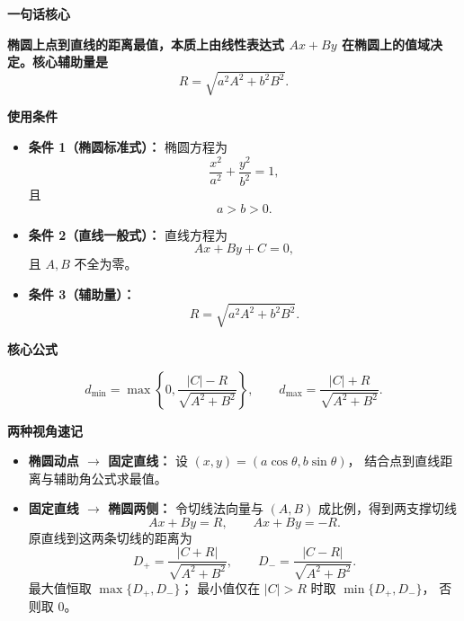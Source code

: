 \begin{summarybox}
	\textbf{\textcolor{CSummary}{一句话核心}}

	\textbf{椭圆上点到直线的距离最值，本质上由线性表达式 \(Ax+By\) 在椭圆上的值域决定。核心辅助量是}
	\[
		R=\sqrt{a^2A^2+b^2B^2}.
	\]

	\medskip

	\textbf{\textcolor{CSummary}{使用条件}}

	\begin{itemize}[leftmargin=*, itemsep=0.5em, topsep=0.4em]
		\item \textbf{条件 1（椭圆标准式）：}
		      椭圆方程为
		      \[
			      \frac{x^2}{a^2}+\frac{y^2}{b^2}=1,
		      \]
		      且
		      \[
			      a>b>0.
		      \]

		\item \textbf{条件 2（直线一般式）：}
		      直线方程为
		      \[
			      Ax+By+C=0,
		      \]
		      且 \(A,B\) 不全为零。

		\item \textbf{条件 3（辅助量）：}
		      \[
			      R=\sqrt{a^2A^2+b^2B^2}.
		      \]
	\end{itemize}

	\medskip

	\textbf{\textcolor{CSummary}{核心公式}}

	\[
		d_{\min}
		=
		\max\left\{0,\frac{|C|-R}{\sqrt{A^2+B^2}}\right\},
		\qquad
		d_{\max}
		=
		\frac{|C|+R}{\sqrt{A^2+B^2}}.
	\]

	\medskip

	\textbf{\textcolor{CSummary}{两种视角速记}}

	\begin{itemize}[leftmargin=*, itemsep=0.35em, topsep=0.3em]
		\item \textbf{椭圆动点 \(\to\) 固定直线：}
		      设 \((x,y)=(a\cos\theta,b\sin\theta)\)，
		      结合点到直线距离与辅助角公式求最值。

		\item \textbf{固定直线 \(\to\) 椭圆两侧：}
		      令切线法向量与 \((A,B)\) 成比例，得到两支撑切线
		      \[
			      Ax+By=R,\qquad Ax+By=-R.
		      \]
		      原直线到这两条切线的距离为
		      \[
			      D_+=\frac{|C+R|}{\sqrt{A^2+B^2}},\qquad
			      D_-=\frac{|C-R|}{\sqrt{A^2+B^2}}.
		      \]
		      最大值恒取 \(\max\{D_+,D_-\}\)；
		      最小值仅在 \(|C|>R\) 时取 \(\min\{D_+,D_-\}\)，
		      否则取 \(0\)。
	\end{itemize}

	\medskip


\end{summarybox}
